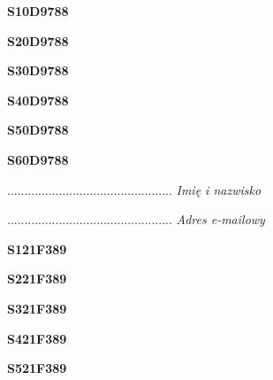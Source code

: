 \begin{turn}{90}\huge \textbf{S10D9788}\end{turn}

\begin{turn}{90}\huge \textbf{S20D9788}\end{turn}

\begin{turn}{90}\huge \textbf{S30D9788}\end{turn}

\begin{turn}{90}\huge \textbf{S40D9788}\end{turn}

\begin{turn}{90}\huge \textbf{S50D9788}\end{turn}

\begin{turn}{90}\huge \textbf{S60D9788}\end{turn}

\begin{turn}{90}\begin{minipage}{\linewidth} \vspace{20mm} ................................................  \textit{Imię i nazwisko}\end{minipage}\end{turn}

\begin{turn}{90}\begin{minipage}{\linewidth} \vspace{20mm} ................................................  \textit{Adres e-mailowy}\end{minipage}\end{turn}

\begin{turn}{90}\huge \textbf{S121F389}\end{turn}

\begin{turn}{90}\huge \textbf{S221F389}\end{turn}

\begin{turn}{90}\huge \textbf{S321F389}\end{turn}

\begin{turn}{90}\huge \textbf{S421F389}\end{turn}

\begin{turn}{90}\huge \textbf{S521F389}\end{turn}

